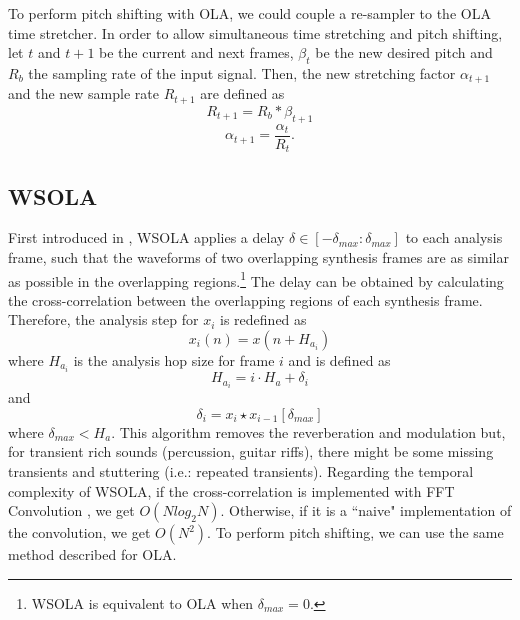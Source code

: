 \documentclass{sig-alternate}
\begin{document}
To perform pitch shifting with OLA, we could couple a re-sampler to the OLA time stretcher. In order to allow simultaneous time stretching and pitch shifting, let $t$ and $t+1$ be the current and next frames, $\beta_{t}$ be the new desired pitch and $R_{b}$ the sampling rate of the input signal. Then, the new stretching factor $\alpha_{t+1}$ and the new sample rate $R_{t+1}$ are defined as 
\begin{equation}
R_{t+1} = R_{b} * \beta_{t+1}
\end{equation}
\begin{equation}
\alpha_{t+1} = \frac{\alpha_{t}}{R_{t}}. %
\end{equation}

\subsection{WSOLA}

First introduced in \cite{verhelst:wsola93}, WSOLA applies a delay $\delta \in [-\delta_{max}:\delta_{max}]$ to each analysis frame, such that the waveforms of two overlapping synthesis frames are as similar as possible in the overlapping regions.\footnote{WSOLA is equivalent to OLA when $\delta_{max}=0$.} The delay can be obtained by calculating the cross-correlation between the overlapping regions of each synthesis frame. Therefore, the analysis step for $x_i$ is redefined as %
\begin{equation}
x_i(n) = x(n + H_{a_i})
\end{equation}
where $H_{a_i}$ is the analysis hop size for frame $i$ and is defined as 
\begin{equation}
H_{a_i} = i \cdot H_a + \delta_i
\end{equation}
and
\begin{equation}
\delta_i = x_i \star x_{i-1}[\delta_{max}]
\end{equation}
where $\delta_{max} < H_a$. This algorithm removes the reverberation and modulation but, for transient rich sounds (percussion, guitar riffs), there might be some missing transients and stuttering (i.e.: repeated transients). Regarding the temporal complexity of WSOLA, if the cross-correlation is implemented with FFT Convolution \cite{dspguide}, we get $O(N log_2 N)$. Otherwise, if it is a ``naive" implementation of the convolution, we get $O(N^2)$.
To perform pitch shifting, we can use the same method described for OLA.
\end{document}
